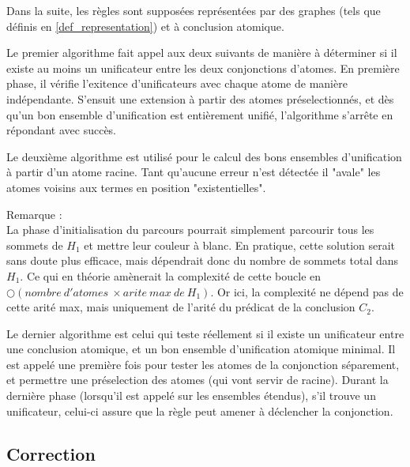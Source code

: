 	Dans la suite, les règles sont supposées représentées par des graphes (tels que
	définis en \ref{def_representation}) et à conclusion atomique.

	Le premier algorithme fait appel aux deux suivants de manière à déterminer si il
	existe au moins un unificateur entre les deux conjonctions d'atomes.
	En première phase, il vérifie l'exitence d'unificateurs avec chaque atome de manière
	indépendante. S'ensuit une extension à partir des atomes préselectionnés, et dès
	qu'un bon ensemble d'unification est entièrement unifié, l'algorithme s'arrête en
	répondant avec succès.
	

	Le deuxième algorithme est utilisé pour le calcul des bons ensembles d'unification à
	partir d'un atome racine. Tant qu'aucune erreur n'est détectée il "avale" les atomes
	voisins aux termes en position "existentielles".
	

	Remarque : \\
	La phase d'initialisation du parcours pourrait simplement parcourir tous les sommets
	de $H_{1}$ et mettre leur couleur \`a blanc.
	En pratique, cette solution serait sans doute plus efficace, mais d\'ependrait donc
	du nombre de sommets total dans $H_{1}$.
	Ce qui en th\'eorie am\`enerait la complexit\'e de cette boucle en 
	$\bigcirc(nombre\ d'atomes\ \times arite\ max\ de\ H_{1})$.
	Or ici, la complexit\'e ne d\'epend pas de cette arit\'e max, mais uniquement de
	l'arit\'e du pr\'edicat de la conclusion $C_{2}$.

	Le dernier algorithme est celui qui teste réellement si il existe un unificateur
	entre une conclusion atomique, et un bon ensemble d'unification atomique minimal.
	Il est appelé une première fois pour tester les atomes de la conjonction séparement,
	et permettre une préselection des atomes (qui vont servir de racine).
	Durant la dernière phase (lorsqu'il est appelé sur les ensembles étendus), s'il trouve
	un unificateur, celui-ci assure que la règle peut amener à déclencher la conjonction.
	



\subsection{Correction}\label{grd_correction}

